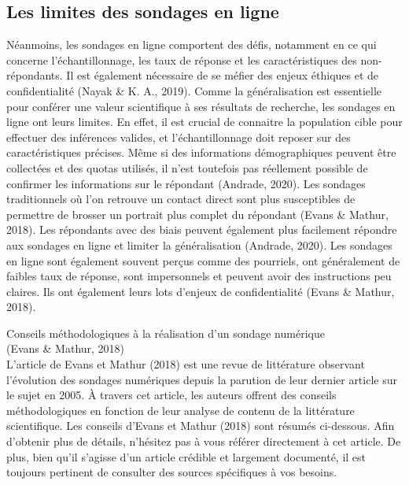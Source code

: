 \documentclass[
  letterpaper,
]{scrbook}
\begin{document}
\hypertarget{les-limites-des-sondages-en-ligne}{%
\subsection{Les limites des sondages en
ligne}\label{les-limites-des-sondages-en-ligne}}

\hfill\break
Néanmoins, les sondages en ligne comportent des défis, notamment en ce
qui concerne l'échantillonnage, les taux de réponse et les
caractéristiques des non-répondants. Il est également nécessaire de se
méfier des enjeux éthiques et de confidentialité (Nayak \& K. A., 2019).
Comme la généralisation est essentielle pour conférer une valeur
scientifique à ses résultats de recherche, les sondages en ligne ont
leurs limites. En effet, il est crucial de connaitre la population cible
pour effectuer des inférences valides, et l'échantillonnage doit reposer
sur des caractéristiques précises. Même si des informations
démographiques peuvent être collectées et des quotas utilisés, il n'est
toutefois pas réellement possible de confirmer les informations sur le
répondant (Andrade, 2020). Les sondages traditionnels où l'on retrouve
un contact direct sont plus susceptibles de permettre de brosser un
portrait plus complet du répondant (Evans \& Mathur, 2018). Les
répondants avec des biais peuvent également plus facilement répondre aux
sondages en ligne et limiter la généralisation (Andrade, 2020). Les
sondages en ligne sont également souvent perçus comme des pourriels, ont
généralement de faibles taux de réponse, sont impersonnels et peuvent
avoir des instructions peu claires. Ils ont également leurs lots
d'enjeux de confidentialité (Evans \& Mathur, 2018).

\hfill\break
Conseils méthodologiques à la réalisation d'un sondage numérique\\
(Evans \& Mathur, 2018)\\
L'article de Evans et Mathur (2018) est une revue de littérature
observant l'évolution des sondages numériques depuis la parution de leur
dernier article sur le sujet en 2005. À travers cet article, les auteurs
offrent des conseils méthodologiques en fonction de leur analyse de
contenu de la littérature scientifique. Les conseils d'Evans et Mathur
(2018) sont résumés ci-dessous. Afin d'obtenir plus de détails,
n'hésitez pas à vous référer directement à cet article. De plus, bien
qu'il s'agisse d'un article crédible et largement documenté, il est
toujours pertinent de consulter des sources spécifiques à vos besoins.
\end{document}
